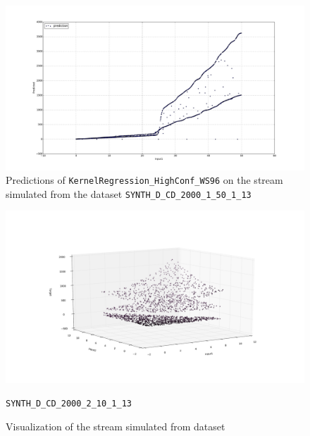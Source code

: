 \begin{figure}[htbp]
  \centering
    \includegraphics[width=\linewidth]{./Figures/kreg_ws96_approximated_func_SYNTH_D_CD_2000_1_50_1_13.pdf}
  \caption{Predictions of \texttt{KernelRegression\_HighConf\_WS96} on the stream simulated from the dataset \texttt{SYNTH\_D\_CD\_2000\_1\_50\_1\_13}}
  \label{fig:kreg_ws96_approximated_func_SYNTH_D_CD_2000_1_50_1_13}
\end{figure}

\begin{figure}[htbp]
  \centering
    \includegraphics[width=\linewidth]{./Figures/ref_func_SYNTH_D_CD_2000_2_10_1_13.pdf}
  \caption{Visualization of the stream simulated from dataset} \texttt{SYNTH\_D\_CD\_2000\_2\_10\_1\_13}
  \label{fig:ref_func_SYNTH_D_CD_2000_2_10_1_13}
\end{figure}

